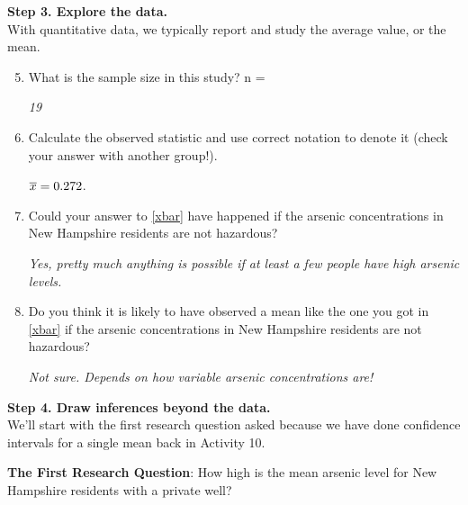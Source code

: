 {\bf Step 3. Explore the data. }\\
With quantitative data, we typically report and study the average value, or the mean.
\begin{enumerate}
\setcounter{enumi}{4}
\item  What is the sample size in this study?  n = \begin{key}
  {\it 19}
\end{key}

\item \label{xbar} Calculate the observed statistic and use correct notation to
  denote it (check your answer with another  group!).
\begin{students}
  \vspace{1cm}
\end{students}
\begin{key}
   $ \overline{x} =   0.272$. 
\end{key}
\item  Could your answer to \ref{xbar} have happened if the arsenic
  concentrations in New Hampshire residents are not hazardous? 
\begin{students}
  \vspace{1cm}
\end{students}
\begin{key}
   {\it Yes, pretty much anything is possible if at least a few people
     have high arsenic levels.}  
\end{key}
\item  Do you think it is likely to have observed a mean like the one
  you got in \ref{xbar} if the arsenic concentrations in New Hampshire
  residents are not hazardous?
  
\begin{students}
  \vspace{1cm}
\end{students}
\begin{key}
   {\it Not sure.  Depends on how variable arsenic concentrations are!
}
\end{key}
\end{enumerate}


{\bf Step 4. Draw inferences beyond the data. }\\
We'll start with the first research question asked because we have
done confidence intervals for a single mean back in Activity 10. 

{\bf The First Research Question}: How high is the mean arsenic level
for New Hampshire residents with a private well? 


